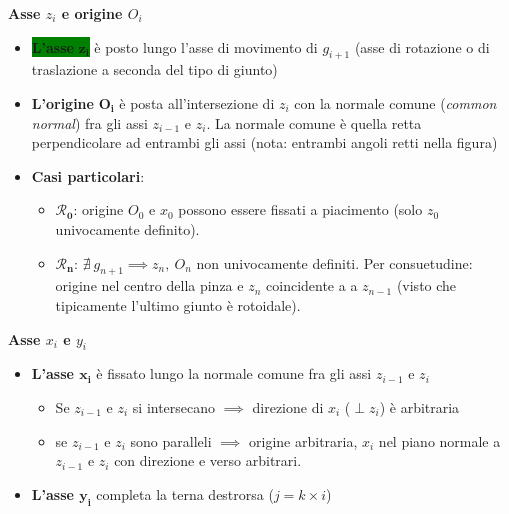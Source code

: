  \textbf{Asse $z_i$ e origine $O_i$}
\begin{itemize}
	\item \colorbox{Green}{\textbf{L’asse} $\boldsymbol{z_i}$} è posto lungo l’asse di movimento di $g_{i+1}$ (asse di rotazione o di traslazione a seconda del tipo di giunto)
	\item \textbf{L’origine} $\boldsymbol{O_i}$ è posta all’intersezione di $z_i$ con la normale comune (\textit{common normal}) fra gli assi $z_{i-1}$ e $z_i$.
	La normale comune è quella retta perpendicolare ad entrambi gli assi (nota: entrambi angoli retti nella figura)
	\item \textbf{Casi particolari}:
	\vspace*{-3pt}
	\begin{itemize}
		\item $\boldsymbol{\mathcal{R}_0}$: origine $O_0$ e $x_0$ possono essere fissati a piacimento (solo $z_0$ univocamente definito).
		\item $\boldsymbol{\mathcal{R}_n}$: $\nexists \ g_{n+1} \implies z_n, \ O_n$ non univocamente definiti. Per consuetudine: origine nel centro della pinza e $z_n$ coincidente a a $z_{n-1}$ (visto che tipicamente l'ultimo giunto è rotoidale).
	\end{itemize}
\end{itemize}
\vspace*{5pt}

 \textbf{Asse $x_i$ e $y_i$}
\begin{itemize}
	\item \colorbox{YellowOrange}{\textbf{L’asse $\boldsymbol{x_i}$}} è fissato lungo la normale comune fra gli assi $z_{i-1}$ e $z_i$
	\begin{itemize}
		\item Se $z_{i-1}$ e $z_i$ si intersecano $\implies$ direzione di $x_i$ ($\perp z_i$) è arbitraria
		\item se $z_{i-1}$ e $z_i$ sono paralleli $\implies$ origine arbitraria, $x_i$ nel piano normale a $z_{i-1}$ e $z_i$ con direzione e verso arbitrari.
	\end{itemize}
	\item \textbf{L’asse $\boldsymbol{y_i}$} completa la terna destrorsa ($j = k\times i$)
\end{itemize}
\vspace*{5pt}

